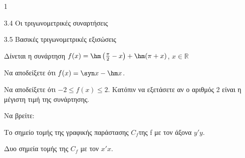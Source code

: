 \begin{ylh}{1}
\item 3.4 Οι τριγωνομετρικές συναρτήσεις
\item 3.5 Βασικές τριγωνομετρικές εξισώσεις
\end{ylh}
Δίνεται η συνάρτηση $f(x) = \hm \left(\frac{\pi}{2} - x\right) + \hm (\pi + x)$, $x \in \mathbb{R}$
\begin{alist}
\item Να αποδείξετε ότι $f(x) = \syn  x - \hm  x$.
\item Να αποδείξετε ότι $-2 \le f(x) \le 2$. Κατόπιν να εξετάσετε αν ο αριθμός 2 είναι η μέγιστη τιμή της συνάρτησης.
\item Να βρείτε:
\end{alist}
\begin{alist}
\item
  Το σημείο τομής της γραφικής παράστασης $C_f$της f με τον άξονα $y'y$.
\end{alist}
\begin{alist}
\item
  Δυο σημεία τομής της $C_f$ με τον $x'x$.
\end{alist}


